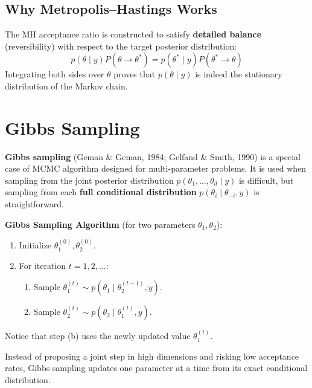 \documentclass[12pt,a4paper]{article}
\begin{document}
\subsection{Why Metropolis--Hastings Works}

The MH acceptance ratio is constructed to satisfy \textbf{detailed balance} (reversibility) with respect to the target posterior distribution:
\[
p(\theta \mid y) P(\theta \to \theta^*) = p(\theta^* \mid y) P(\theta^* \to \theta)
\]
Integrating both sides over $\theta$ proves that $p(\theta \mid y)$ is indeed the stationary distribution of the Markov chain.

\newpage

\section{Gibbs Sampling}

\textbf{Gibbs sampling} (Geman \& Geman, 1984; Gelfand \& Smith, 1990) is a special case of MCMC algorithm designed for multi-parameter problems. It is used when sampling from the joint posterior distribution $p(\theta_1, \ldots, \theta_d \mid y)$ is difficult, but sampling from each \textbf{full conditional distribution} $p(\theta_i \mid \theta_{-i}, y)$ is straightforward.

\begin{defbox}
\textbf{Gibbs Sampling Algorithm} (for two parameters $\theta_1, \theta_2$):
\begin{enumerate}[leftmargin=1.5em]
    \item Initialize $\theta_1^{(0)}, \theta_2^{(0)}$.
    \item For iteration $t = 1, 2, \ldots$:
    \begin{enumerate}[label=\alph*.]
        \item Sample $\theta_1^{(t)} \sim p(\theta_1 \mid \theta_2^{(t-1)}, y)$.
        \item Sample $\theta_2^{(t)} \sim p(\theta_2 \mid \theta_1^{(t)}, y)$.
    \end{enumerate}
\end{enumerate}
Notice that step (b) uses the newly updated value $\theta_1^{(t)}$.
\end{defbox}

\begin{keyidea}
Instead of proposing a joint step in high dimensions and risking low acceptance rates, Gibbs sampling updates one parameter at a time from its exact conditional distribution.
\end{keyidea}
\end{document}
